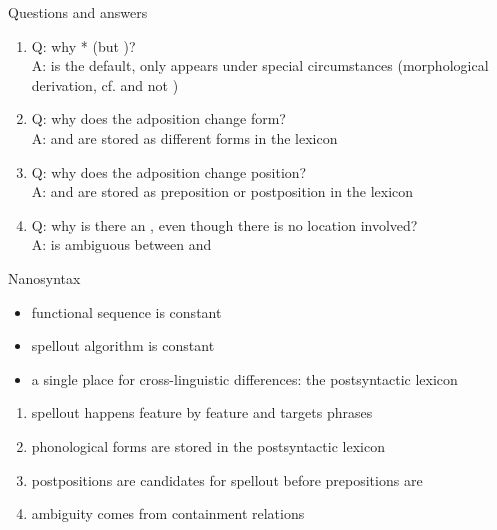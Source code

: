 \documentclass[xcolor=dvipsnames,10pt]{beamer}
\begin{document}
\begin{frame}{Questions and answers}


\vspace{1em}

\begin{enumerate}
  \item Q: why * (but )? \pause\\
  A:  is the default,  only appears under special circumstances (morphological derivation, cf.  and not )\pause
  \item Q: why does the adposition change form? \pause\\
  A:  and  are stored as different forms in the lexicon \pause
  \item Q: why does the adposition change position? \pause\\
  A:  and  are stored as preposition or postposition in the lexicon \pause
  \item Q: why is there an , even though there is no location involved? \pause\\
  A:  is ambiguous between  and 
\end{enumerate}

\end{frame}


\begin{frame}{Nanosyntax}

\begin{itemize}
  \item functional sequence is constant\pause
  \item spellout algorithm is constant\pause
  \item a single place for cross-linguistic differences: the postsyntactic lexicon\pause
\end{itemize}

\vspace{1em}

\begin{enumerate}
  \item spellout happens feature by feature and targets phrases
  \item phonological forms are stored in the postsyntactic lexicon
  \item postpositions are candidates for spellout before prepositions are
  \item ambiguity comes from containment relations
\end{enumerate}

\end{frame}
\end{document}
